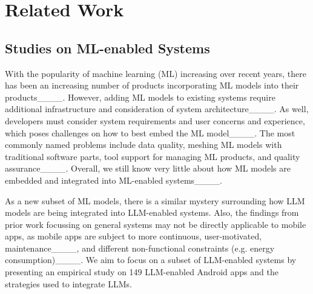 \section{Related Work}
\label{related-work}

\subsection{Studies on ML-enabled Systems}

With the popularity of machine learning (ML) increasing over recent years, there has been an increasing number of products incorporating ML models into their products____. However, adding ML models to existing systems require additional infrastructure and consideration of system architecture____. As well, developers must consider system requirements and user concerns and experience, which poses challenges on how to best embed the ML model____. The most commonly named problems include data quality, meshing ML models with traditional software parts, tool support for managing ML products, and quality assurance____. Overall, we still know very little about how ML models are embedded and integrated into ML-enabled systems____. 

As a new subset of ML models, there is a similar mystery surrounding how LLM models are being integrated into LLM-enabled systems. Also, the findings from prior work focussing on general systems may not be directly applicable to mobile apps, as mobile apps are subject to more continuous, user-motivated, maintenance____, and different non-functional constraints (e.g. energy consumption)____. We aim to focus on a subset of LLM-enabled systems by presenting an empirical study on 149 LLM-enabled Android apps and the strategies used to integrate LLMs. 





